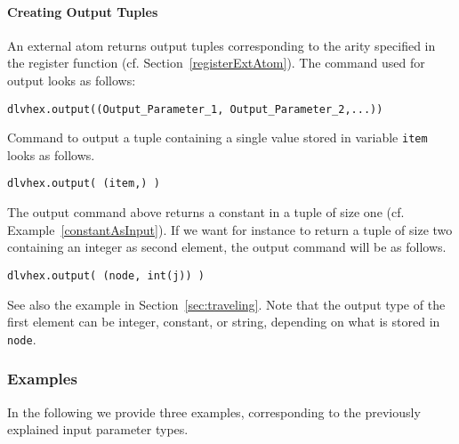 \documentclass[a4paper, titlepage]{article}
\begin{document}
\paragraph{Creating Output Tuples}
An external atom returns output tuples corresponding to the arity
specified in the register function (cf. Section~\ref{registerExtAtom}).
The \dlvhex{} command used for output looks as follows: 
\begin{lstlisting}
dlvhex.output((Output_Parameter_1, Output_Parameter_2,...))
\end{lstlisting}
Command to output a tuple containing a single value
stored in variable \verb|item| looks as follows.
\begin{lstlisting}
dlvhex.output( (item,) )
\end{lstlisting}
The output command above returns a constant in a tuple of size one
(cf. Example~\ref{constantAsInput}). 
If we want for instance to return a tuple of size two
containing an integer as second element,
the output command will be as follows.
\begin{lstlisting}
dlvhex.output( (node, int(j)) )
\end{lstlisting}
See also the example in Section~\ref{sec:traveling}.
Note that the output type of the first element
can be integer, constant, or string,
depending on what is stored in \verb|node|.

\subsubsection{Examples}
In the following we provide three examples,
corresponding to the previously explained input parameter types.
\end{document}
